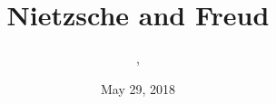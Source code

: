 \documentclass[xcolor=dvipsnames]{beamer}
\title{Nietzsche and Freud}
\subtitle{{\CourseNumber}, {\CourseInst}}
\author{\CourseName}
\date{May 29, 2018}
\begin{document}
\begin{frame}
  \titlepage
\end{frame}


\end{document}
